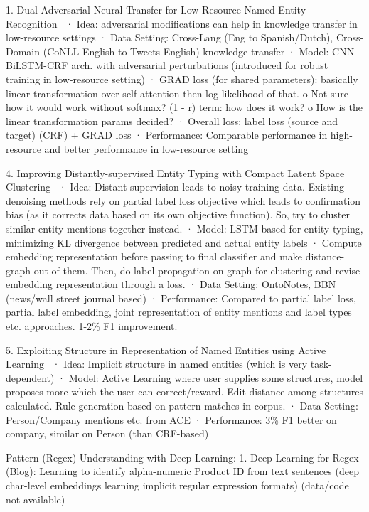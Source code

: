 1. Dual Adversarial Neural Transfer for Low-Resource Named Entity Recognition~\cite{ZhouZJZFGK19}
·        Idea: adversarial modifications can help in knowledge transfer in low-resource settings
·        Data Setting: Cross-Lang (Eng to Spanish/Dutch), Cross-Domain (CoNLL English to Tweets English) knowledge transfer
·        Model: CNN-BiLSTM-CRF arch. with adversarial perturbations (introduced for robust training in low-resource setting)
·        GRAD loss (for shared parameters): basically linear transformation over self-attention then log likelihood of that.
o   Not sure how it would work without softmax? (1 - r) term: how does it work?
o   How is the linear transformation params decided?
·        Overall loss: label loss (source and target) (CRF) + GRAD loss
·        Performance: Comparable performance in high-resource and better performance in low-resource setting
 
 
 
4.      Improving Distantly-supervised Entity Typing with Compact Latent Space Clustering~\cite{PengXZFH19}
·        Idea: Distant supervision leads to noisy training data. Existing denoising methods rely on partial label loss objective which leads to confirmation bias (as it corrects data based on its own objective function). So, try to cluster similar entity mentions together instead.
·        Model: LSTM based for entity typing, minimizing KL divergence between predicted and actual entity labels
·        Compute embedding representation before passing to final classifier and make distance-graph out of them. Then, do label propagation on graph for clustering and revise embedding representation through a loss.
·        Data Setting: OntoNotes, BBN (news/wall street journal based)
·        Performance:  Compared to partial label loss, partial label embedding, joint representation of entity mentions and label types etc. approaches. 1-2\% F1 improvement.
 
5.      Exploiting Structure in Representation of Named Entities using Active Learning~\cite{BhutaniQ0JHV18}
·        Idea: Implicit structure in named entities (which is very task-dependent)
·        Model: Active Learning where user supplies some structures, model proposes more which the user can correct/reward. Edit distance among structures calculated. Rule generation based on pattern matches in corpus.
·        Data Setting: Person/Company mentions etc. from ACE
·        Performance: 3\% F1 better on company, similar on Person (than CRF-based)


Pattern (Regex) Understanding with Deep Learning:
1.      Deep Learning for Regex (Blog): Learning to identify alpha-numeric Product ID from text sentences (deep char-level embeddings learning implicit regular expression formats) (data/code not available)
 
